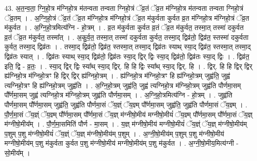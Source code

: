\documentclass[17pt]{extarticle}
\begin{document}
43. अ॒त॒न्व॒ता॒ ग्नि॒हो॒त्र म॑ग्निहो॒त्र म॑तन्वता तन्वता ग्निहो॒त्रं ॅव्र॒तं ॅव्र॒त म॑ग्निहो॒त्र म॑तन्वता तन्वता ग्निहो॒त्रं ॅव्र॒तम् । . अ॒ग्नि॒हो॒त्रं ॅव्र॒तं ॅव्र॒त म॑ग्निहो॒त्र म॑ग्निहो॒त्रं ॅव्र॒त म॑कुर्वता कुर्वत व्र॒त म॑ग्निहो॒त्र म॑ग्निहो॒त्रं ॅव्र॒त म॑कुर्वत । . अ॒ग्नि॒हो॒त्रमित्य॑ग्नि - हो॒त्रम् । . व्र॒त म॑कुर्वता कुर्वत व्र॒तं ॅव्र॒त म॑कुर्वत॒ तस्मा॒त् तस्मा॑ दकुर्वत व्र॒तं ॅव्र॒त म॑कुर्वत॒ तस्मा᳚त् । . अ॒कु॒र्व॒त॒ तस्मा॒त् तस्मा॑ दकुर्वता कुर्वत॒ तस्मा॒द् द्विव्र॑तो॒ द्विव्र॑त॒ स्तस्मा॑ दकुर्वता कुर्वत॒ तस्मा॒द् द्विव्र॑तः । . तस्मा॒द् द्विव्र॑तो॒ द्विव्र॑त॒ स्तस्मा॒त् तस्मा॒द् द्विव्र॑तः स्याथ् स्या॒द् द्विव्र॑त॒ स्तस्मा॒त् तस्मा॒द् द्विव्र॑तः स्यात् । . द्विव्र॑तः स्याथ् स्या॒द् द्विव्र॑तो॒ द्विव्र॑तः स्या॒द् द्विर् द्विः स्या॒द् द्विव्र॑तो॒ द्विव्र॑तः स्या॒द् द्विः । . द्विव्र॑त॒ इति॒ द्वि - व्र॒तः॒ । . स्या॒द् द्विर् द्विः स्या᳚थ् स्या॒द् द्विर्. हि हि द्विः स्या᳚थ् स्या॒द् द्विर्. हि । . द्विर्. हि हि द्विर् द्विर् ह्य॑ग्निहो॒त्र म॑ग्निहो॒त्रꣳ हि द्विर् द्विर् ह्य॑ग्निहो॒त्रम् । . ह्य॑ग्निहो॒त्र म॑ग्निहो॒त्रꣳ हि ह्य॑ग्निहो॒त्रम् जुह्व॑ति॒ जुह्व॑ त्यग्निहो॒त्रꣳ हि ह्य॑ग्निहो॒त्रम् जुह्व॑ति । . अ॒ग्नि॒हो॒त्रम् जुह्व॑ति॒ जुह्व॑ त्यग्निहो॒त्र म॑ग्निहो॒त्रम् जुह्व॑ति पौर्णमा॒सम् पौ᳚र्णमा॒सम् जुह्व॑ त्यग्निहो॒त्र म॑ग्निहो॒त्रम् जुह्व॑ति पौर्णमा॒सम् । . अ॒ग्नि॒हो॒त्रमित्य॑ग्नि - हो॒त्रम् । . जुह्व॑ति पौर्णमा॒सम् पौ᳚र्णमा॒सम् जुह्व॑ति॒ जुह्व॑ति पौर्णमा॒सं ॅय॒ज्ञ्ं ॅय॒ज्ञ्म् पौ᳚र्णमा॒सम् जुह्व॑ति॒ जुह्व॑ति पौर्णमा॒सं ॅय॒ज्ञ्म् । . पौ॒र्ण॒मा॒सं ॅय॒ज्ञ्ं ॅय॒ज्ञ्म् पौ᳚र्णमा॒सम् पौ᳚र्णमा॒सं ॅय॒ज्ञ् म॑ग्नीषो॒मीय॑ मग्नीषो॒मीयं॑ ॅय॒ज्ञ्म् पौ᳚र्णमा॒सम् पौ᳚र्णमा॒सं ॅय॒ज्ञ् म॑ग्नीषो॒मीय᳚म् । . पौ॒र्ण॒मा॒समिति॑ पौर्ण - मा॒सम् । . य॒ज्ञ् म॑ग्नीषो॒मीय॑ मग्नीषो॒मीयं॑ ॅय॒ज्ञ्ं ॅय॒ज्ञ् म॑ग्नीषो॒मीय॑म् प॒शुम् प॒शु म॑ग्नीषो॒मीयं॑ ॅय॒ज्ञ्ं ॅय॒ज्ञ् म॑ग्नीषो॒मीय॑म् प॒शुम् । . अ॒ग्नी॒षो॒मीय॑म् प॒शुम् प॒शु म॑ग्नीषो॒मीय॑ मग्नीषो॒मीय॑म् प॒शु म॑कुर्वता कुर्वत प॒शु म॑ग्नीषो॒मीय॑ मग्नीषो॒मीय॑म् प॒शु म॑कुर्वत । . अ॒ग्नी॒षो॒मीय॒मित्य॑ग्नी - सो॒मीय᳚म् । \newline
\pagebreak
{}
\end{document}
